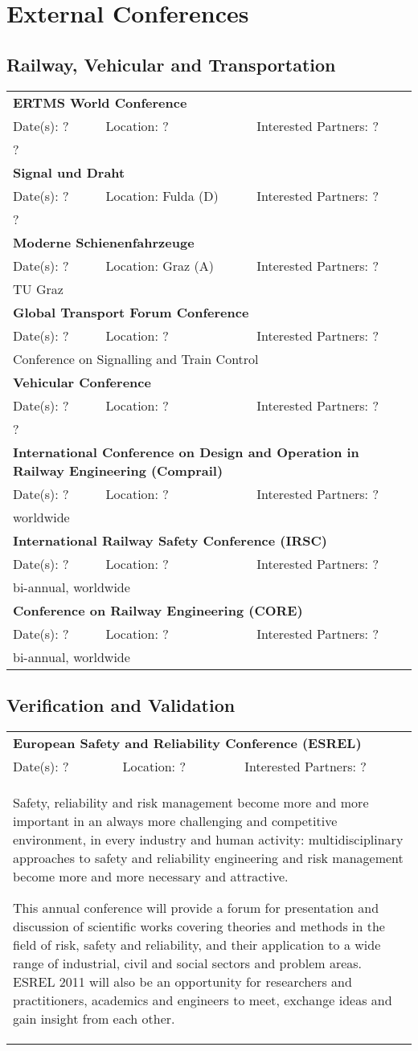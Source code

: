 ﻿\section{External Conferences}

\subsection{Railway, Vehicular and Transportation}

\renewcommand{\tableentry}[5]{\multicolumn{3}{|l|}{\textbf{#1}}\\Date(s): #2&Location: #3&Interested Partners: #4\\\multicolumn{3}{|p{\textwidth}|}{#5}\\\hline}

\begin{longtable}{|lll|}
 \hline
 \tableentry{ERTMS World Conference}{?}{?}{?}{
	?
 }
 \tableentry{Signal und Draht}{?}{Fulda (D)}{?}{
	?
 }
 \tableentry{Moderne Schienenfahrzeuge}{?}{Graz (A)}{?}{
	TU Graz
 }
 \tableentry{Global Transport Forum Conference}{?}{?}{?}{
	Conference on Signalling and Train Control
 }
 \tableentry{Vehicular Conference}{?}{?}{?}{
	?
 }
 \tableentry{International Conference on Design and Operation in Railway Engineering (Comprail)}{?}{?}{?}{
	worldwide
 }
 \tableentry{International Railway Safety Conference (IRSC)}{?}{?}{?}{
	bi-annual, worldwide
 }
 \tableentry{Conference on Railway Engineering (CORE)}{?}{?}{?}{
	bi-annual, worldwide
 }
\end{longtable}

\subsection{Verification and Validation}


\begin{longtable}{|lll|}
 \hline
 \tableentry{European Safety and Reliability Conference (ESREL)}{?}{?}{?}{
	Safety, reliability and risk management become more and more important in an always more challenging and competitive environment, in every industry and human activity: multidisciplinary approaches to safety and reliability engineering and risk management become more and more necessary and attractive.

	This annual conference will provide a forum for presentation and discussion of scientific works covering theories and methods in the field of risk, safety and reliability, and their application to a wide range of industrial, civil and social sectors and problem areas. ESREL 2011 will also be an opportunity for researchers and practitioners, academics and engineers to meet, exchange ideas and gain insight from each other.
 }
\end{longtable}



